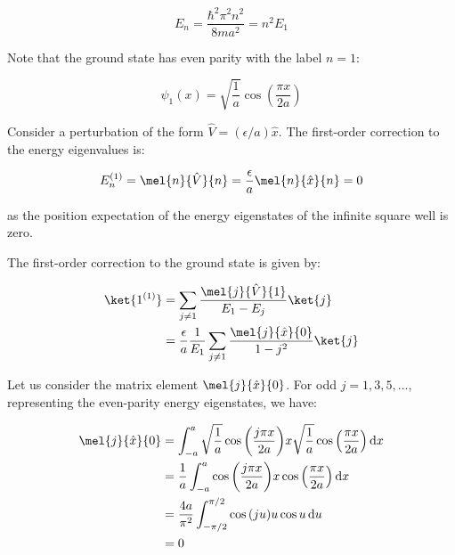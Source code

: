 \documentclass[12pt]{article}
\begin{document}
\begin{equation}
    E_{n} = \frac{\hbar^{2} \pi^{2} n^{2}}{8ma^{2}} = n^{2} E_{1}
\end{equation}

Note that the ground state has even parity with the label $n = 1$:

\begin{equation}
    \psi_{1}(x) = \sqrt{\frac{1}{a}} \cos{\left( \frac{\pi x}{2a} \right)}
\end{equation}

Consider a perturbation of the form $\hat{V} = (\epsilon/a) \hat{x}$. The first-order correction to the energy eigenvalues is:

\begin{equation}
    E_{n}^{(1)} = \mel{n}{\hat{V}}{n} = \frac{\epsilon}{a} \mel{n}{\hat{x}}{n} = 0
\end{equation}

as the position expectation of the energy eigenstates of the infinite square well is zero.

The first-order correction to the ground state is given by:

\begin{equation}
    \begin{split}
        \ket{1^{(1)}} &= \sum_{j \ne 1} \frac{\mel{j}{\hat{V}}{1}}{E_{1} - E_{j}} \ket{j} \\
        &= \frac{\epsilon}{a} \frac{1}{E_{1}} \sum_{j \ne 1} \frac{\mel{j}{\hat{x}}{0}}{1 - j^{2}} \ket{j}
    \end{split}
\end{equation}

Let us consider the matrix element $\mel{j}{\hat{x}}{0}$. For odd $j = 1, 3, 5, \ldots$, representing the even-parity energy eigenstates, we have:

\begin{equation}
    \begin{split}
        \mel{j}{\hat{x}}{0} &= \int_{-a}^{a} \sqrt{\frac{1}{a}} \cos{\left( \frac{j\pi x}{2a} \right)} x \sqrt{\frac{1}{a}} \cos{\left( \frac{\pi x}{2a} \right)} \, \mathrm{d}x \\
        &= \frac{1}{a} \int_{-a}^{a} \cos{\left( \frac{j\pi x}{2a} \right)} x \cos{\left( \frac{\pi x}{2a} \right)} \, \mathrm{d}x \\
        &= \frac{4a}{\pi^{2}} \int_{-\pi/2}^{\pi/2} \cos{(ju)} u \cos{u} \, \mathrm{d}u \\
        &= 0
    \end{split}
\end{equation}
\end{document}
